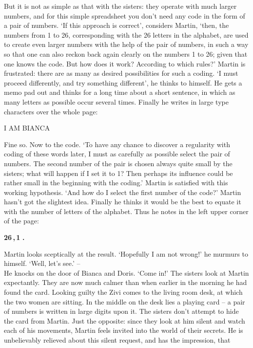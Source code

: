 \[\]
But it is not as simple as that with the sisters: they operate with much larger 
numbers, and for this simple spreadsheet you don't need any code in the form of a 
pair of numbers. 
`If this approach is correct', considers Martin, `then, the numbers from 1 to 26, 
corresponding with the 26 letters in the alphabet, are used to create even larger 
numbers with the help of the pair of numbers, in such a way so that one can also 
reckon back again clearly on the numbers 1 to 26; given that one knows the code.
But how does it work? According to which rules?' 
Martin is frustrated: there are as many as desired possibilities for such a coding. 
`I must proceed differently, and try something different', he thinks to himself. 
He gets a memo pad out and thinks for a long time about a short sentence, in which 
as many letters as possible occur several times. 
Finally he writes in large type characters over the whole page: 
\begin{center} 
I AM BIANCA 
\end{center} 
Fine so. Now to the code. 
`To have any chance to discover a regularity with coding of these words later, I 
must as carefully as possible select the pair of numbers. 
The second number of the pair is chosen always quite small by the sisters; what 
will happen if I set it to 1? 
Then perhaps its influence could be rather small in the beginning with the coding.'
Martin is satisfied with this working hypothesis. 
`And how do I select the first number of the code?' 
Martin hasn't got the slightest idea.
Finally he thinks it would be the best to equate it with the number of letters of the alphabet. 
Thus he notes in the left upper corner of the page: 
\begin{center}
{\bf 26\,,\,1\,\,.}
\end{center}
Martin looks sceptically at the result. 
`Hopefully I am not wrong!' he murmurs to himself. 
`Well, let's see.' -- \\ 
He knocks on the door of Bianca and Doris. `Come in!' 
The sisters look at Martin expectantly. They are now much calmer than when earlier 
in the morning he had found the card.
Looking guilty the Zivi comes to the living room desk, at which the two women are sitting. 
In the middle on the desk lies a playing card -- a pair of numbers is written in large 
digits upon it. 
The sisters don't attempt to hide the card from Martin. 
Just the opposite: since they look at him silent and watch each of his movements, 
Martin feels invited into the world of their secrets. 
He is unbelievably relieved about this silent request, and has the impression, that 
